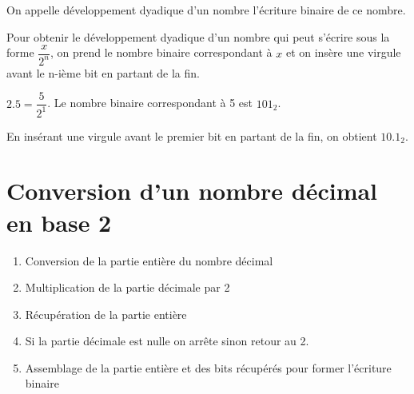\begin{definition}{}
	
	On appelle développement dyadique d'un nombre l'écriture binaire de ce nombre.
\end{definition}

\begin{propriete}{}
	
	Pour obtenir le développement dyadique d'un nombre qui peut s'écrire sous la forme $\dfrac{x}{2^n}$, on prend le nombre binaire correspondant à $x$ et on insère une virgule avant le n-ième bit en partant de la fin.
\end{propriete}

\begin{exemple}{}

	$2.5 = \dfrac{5}{2^1}$. Le nombre binaire correspondant à 5 est $101_2$. 
	
	En insérant une virgule avant le premier bit en partant de la fin, on obtient $10.1_2$.

\end{exemple}

	\begin{exercice_cours}
\vspace{2cm}
	\end{exercice_cours}


\section{Conversion d'un nombre décimal en base 2}

	\begin{methode}{\quad}{}
	\begin{enumerate}
	\item Conversion de la partie entière du nombre décimal
	\item Multiplication de la partie décimale par 2
	\item Récupération de la partie entière 
	\item Si la partie décimale est nulle on arrête sinon retour au 2.
	\item Assemblage de la partie entière et des bits récupérés pour former l'écriture binaire
\end{enumerate}
	\end{methode}

